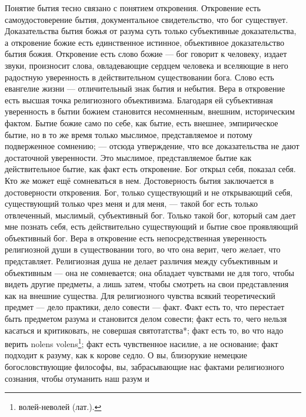 \documentclass[12pt,oneside]{book}
\begin{document}
Понятие бытия тесно связано с понятием откровения. Откровение есть самоудостоверение бытия, документальное свидетельство, что бог существует. Доказательства бытия божья от разума суть только субъективные доказательства, а откровение божие есть единственное истинное, объективное доказательство бытия божия. Откровение есть слово божие --- бог говорит к человеку, издает звуки, произносит слова, овладевающие сердцем человека и вселяющие в него радостную уверенность в действительном существовании бога. Слово есть евангелие жизни --- отличительный знак бытия и небытия. Вера в откровение есть высшая точка религиозного объективизма. Благодаря ей субъективная уверенность в бытии божием становится несомненным, внешним, историческим фактом. Бытие божие само по себе, как бытие, есть внешнее, эмпирическое бытие, но в то же время только мыслимое, представляемое и потому подверженное сомнению; --- отсюда утверждение, что все доказательства не дают достаточной уверенности. Это мыслимое, представляемое бытие как действительное бытие, как факт есть откровение. Бог открыл себя, показал себя. Кто же может ещё сомневаться в нем. Достоверность бытия заключается в достоверности откровения. Бог, только существующий и не открывающий себя, существующий только чрез меня и для меня, --- такой бог есть только отвлеченный, мыслимый, субъективный бог. Только такой бог, который сам дает мне познать себя, есть действительно существующий и бытие свое проявляющий объективный бог. Вера в откровение есть непосредственная уверенность религиозной души в существовании того, во что она верит, чего желает, что представляет. Религиозная душа не делает различия между субъективным и объективным --- она не сомневается; она обладает чувствами не для того, чтобы видеть другие предметы, а лишь затем, чтобы смотреть на свои представления как на внешние существа. Для религиозного чувства всякий теоретический предмет --- дело практики, дело совести --- факт. Факт есть то, что перестает быть предметом разума и становится делом совести; факт есть то, чего нельзя касаться и критиковать, не совершая святотатства*\let\svthefootnote\thefootnote\let\thefootnote\relax{}\let\thefootnote\svthefootnote; факт есть то, во что надо верить nolens volens\footnote{волей-неволей (лат.).}; факт есть чувственное насилие, а не основание; факт подходит к разуму, как к корове седло. О вы, близорукие немецкие богословствующие философы, вы, забрасывающие нас фактами религиозного сознания, чтобы отуманить наш разум и 
\end{document}
